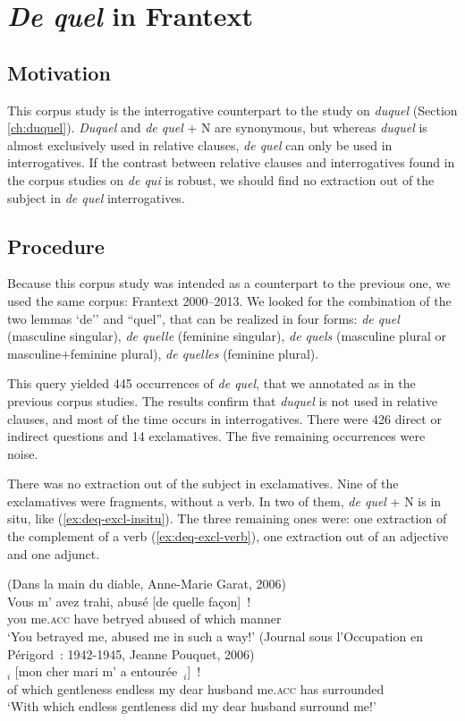 \section{\emph{De quel} in Frantext}
\label{ch:deq-corpus}

\subsection{Motivation}

This corpus study is the interrogative counterpart to the study on \emph{duquel} (Section \ref{ch:duquel}). \emph{Duquel} and \emph{de quel} + N are synonymous, but whereas \emph{duquel} is almost exclusively used in relative clauses, \emph{de quel} can only be used in interrogatives. 
If the contrast between relative clauses and interrogatives found in the corpus studies on \emph{de qui} is robust, we should find no extraction out of the subject in \emph{de quel} interrogatives. 

\subsection{Procedure}

Because this corpus study was intended as a counterpart to the previous one, we used the same corpus: Frantext 2000--2013. We looked for the combination of the two lemmas `de'' and ``quel'', that can be realized in four forms: \emph{de quel} (masculine singular), \emph{de quelle} (feminine singular), \emph{de quels} (masculine plural or masculine+feminine plural), \emph{de quelles} (feminine plural).

This query yielded 445 occurrences of \emph{de quel}, that we annotated as in the previous corpus studies. The results confirm that \emph{duquel} is not used in relative clauses, and most of the time occurs in interrogatives. There were 426 direct or indirect questions and 14 exclamatives. The five remaining occurrences were noise.

There was no extraction out of the subject in exclamatives. Nine of the exclamatives were fragments, without a verb. In two of them, \emph{de quel} + N is in situ, like (\ref{ex:deq-excl-insitu}). The three remaining ones were: one extraction of the complement of a verb (\ref{ex:deq-excl-verb}), one extraction out of an adjective and one adjunct.

\eal 
\ex (Dans la main du diable, Anne-Marie Garat, 2006)\\
\gll Vous m' avez trahi, abusé [de	quelle façon]~!\\
you me\textsc{.acc} have betryed abused of which manner\\
\glt `You betrayed me, abused me in such a way!'
\label{ex:deq-excl-insitu}
\ex (Journal sous l'Occupation en Périgord~: 1942-1945, Jeanne Pouquet, 2006)\\
$_i$ [mon cher mari m' a entourée~\trace{}$_i$]~!\\
of which gentleness endless my dear husband me\textsc{.acc} has surrounded\\
\glt `With which endless gentleness did my dear husband surround me!'
\label{ex:deq-excl-verb}
\zl 

